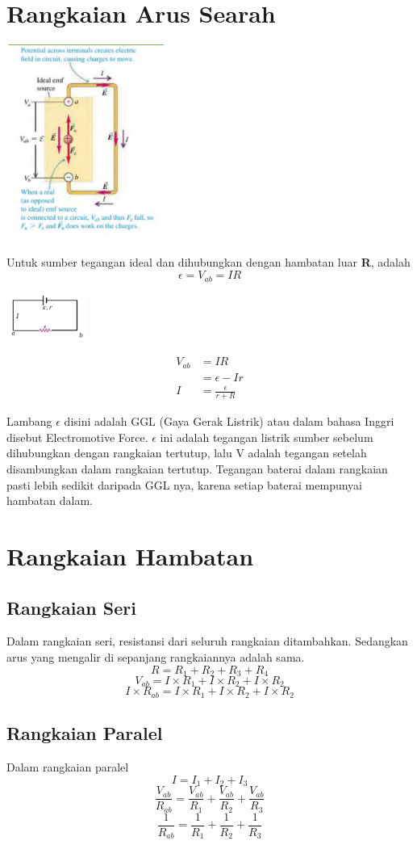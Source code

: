 \documentclass[twocolumn, 11pt]{article}%
\begin{document}
    \section{Rangkaian Arus Searah}%
    \begin{center}
        \includegraphics[width=200px]{2.png}
    \end{center}
    Untuk sumber tegangan ideal dan dihubungkan dengan hambatan luar \textbf{R}, adalah
    \[ \epsilon = V_{ab} =IR\]
    \begin{center}
        \includegraphics[width=100px]{1.png}
    \end{center}
    \begin{align*}
        V_{ab}&=IR\\
        &=\epsilon-Ir\\
        I&=\frac{\epsilon}{r+R}
    \end{align*}

    Lambang $\epsilon$ disini adalah GGL (Gaya Gerak Listrik) atau dalam bahasa Inggri disebut Electromotive Force. $\epsilon$ ini adalah tegangan listrik sumber sebelum dihubungkan dengan rangkaian tertutup, lalu V adalah tegangan setelah disambungkan dalam rangkaian tertutup. Tegangan baterai dalam rangkaian pasti lebih sedikit daripada GGL nya, karena setiap baterai mempunyai hambatan dalam.

    \section{Rangkaian Hambatan}%
    \subsection{Rangkaian Seri}%
    Dalam rangkaian seri, resistansi dari seluruh rangkaian ditambahkan. Sedangkan arus yang mengalir di sepanjang rangkaiannya adalah sama.
    \[R = R_1 +R_2+R_3+R_4 \]
    \[V_{ab} = I\times R_1 + I\times R_2 + I\times R_2 \]
    \[I\times R_{ab} = I\times R_1 + I\times R_2 + I\times R_2 \]

    \subsection{Rangkaian Paralel}%
    Dalam rangkaian paralel
    \[I=I_1 + I_2 + I_3 \]
    \[\frac{V_{ab}}{R_{ab}} = \frac{V_{ab}}{R_1}+\frac{V_{ab}}{R_2}+\frac{V_{ab}}{R_3} \]
    \[\frac{1}{R_{ab}} = \frac{1}{R_1}+\frac{1}{R_2}+\frac{1}{R_3} \]
\end{document}
